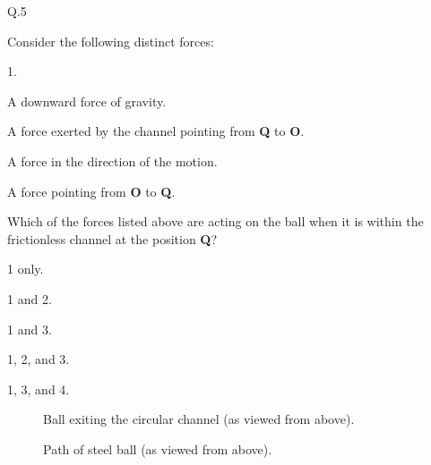     \begin{mcq}{Q.5}{Consider the following distinct forces:

        \eline[]
        \begin{options}{1.}
            \item A downward force of gravity.
            \item A force exerted by the channel pointing from \textbf{Q} to \textbf{O}.
            \item A force in the direction of the motion.
            \item A force pointing from \textbf{O} to \textbf{Q}.
        \end{options}
        \eline[]

        Which of the forces listed above are acting on the ball when it is within the frictionless channel at the position \textbf{Q}?
    }

        \item 1 only.
        \item 1 and 2.
        \item 1 and 3.
        \item 1, 2, and 3.
        \item 1, 3, and 4.
    \end{mcq}

    \newpage    %
%

    \begin{figure}[h!]
        \begin{center}
            
            \caption{\label{fig:channel_exit} Ball exiting the circular channel (as viewed from above).}
        \end{center}
    \end{figure}


    \begin{figure}[h!]
        \begin{center}
            
            \caption{\label{fig:whirling_ball} Path of steel ball (as viewed from above).}
        \end{center}
    \end{figure}


